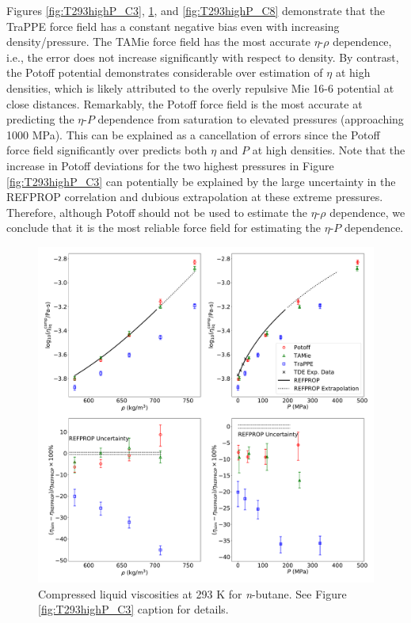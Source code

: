 \documentclass[preprint,review,12pt]{elsarticle}
\begin{document}
	Figures \ref{fig:T293highP_C3}, \ref{fig:T293highP_C4}, and \ref{fig:T293highP_C8} demonstrate that the TraPPE force field has a constant negative bias even with increasing density/pressure. The TAMie force field has the most accurate $\eta$-$\rho$ dependence, i.e., the error does not increase significantly with respect to density. By contrast, the Potoff potential demonstrates considerable over estimation of $\eta$ at high densities, which is likely attributed to the overly repulsive Mie 16-6 potential at close distances. Remarkably, the Potoff force field is the most accurate at predicting the $\eta$-$P$ dependence from saturation to elevated pressures (approaching 1000 MPa). This can be explained as a cancellation of errors since the Potoff force field significantly over predicts both $\eta$ and $P$ at high densities. Note that the increase in Potoff deviations for the two highest pressures in Figure \ref{fig:T293highP_C3} can potentially be explained by the large uncertainty in the REFPROP correlation and dubious extrapolation at these extreme pressures. Therefore, although Potoff should not be used to estimate the $\eta$-$\rho$ dependence, we conclude that it is the most reliable force field for estimating the $\eta$-$P$ dependence.
	
	\begin{figure}[htb!]
		\centering
		\includegraphics[width=6.4in]{compare_REFPROP_T293highP_C4H10.pdf}
		\caption{Compressed liquid viscosities at 293 K for \textit{n}-butane. See Figure \ref{fig:T293highP_C3} caption for details.}
		\label{fig:T293highP_C4}
	\end{figure} 
	
\end{document}
